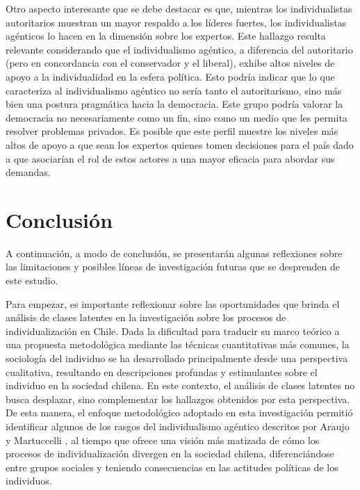\documentclass[12pt,twoside]{templates/facsothesis}
\begin{document}
Otro aspecto interesante que se debe destacar es que, mientras los individualistas autoritarios muestran un mayor respaldo a los líderes fuertes, los individualistas agénticos lo hacen en la dimensión sobre los expertos. Este hallazgo resulta relevante considerando que el individualismo agéntico, a diferencia del autoritario (pero en concordancia con el conservador y el liberal), exhibe altos niveles de apoyo a la individualidad en la esfera política. Esto podría indicar que lo que caracteriza al individualismo agéntico no sería tanto el autoritarismo, sino más bien una postura pragmática hacia la democracia. Este grupo podría valorar la democracia no necesariamente como un fin, sino como un medio que les permita resolver problemas privados. Es posible que este perfil muestre los niveles más altos de apoyo a que sean los expertos quienes tomen decisiones para el país dado a que asociarían el rol de estos actores a una mayor eficacia para abordar sus demandas.

\hypertarget{conclusiuxf3n}{%
\chapter{Conclusión}\label{conclusiuxf3n}}

A continuación, a modo de conclusión, se presentarán algunas reflexiones sobre las limitaciones y posibles líneas de investigación futuras que se desprenden de este estudio.

Para empezar, es importante reflexionar sobre las oportunidades que brinda el análisis de clases latentes en la investigación sobre los procesos de individualización en Chile. Dada la dificultad para traducir su marco teórico a una propuesta metodológica mediante las técnicas cuantitativas más comunes, la sociología del individuo se ha desarrollado principalmente desde una perspectiva cualitativa, resultando en descripciones profundas y estimulantes sobre el individuo en la sociedad chilena. En este contexto, el análisis de clases latentes no busca desplazar, sino complementar los hallazgos obtenidos por esta perspectiva. De esta manera, el enfoque metodológico adoptado en esta investigación permitió identificar algunos de los rasgos del individualismo agéntico descritos por Araujo y Martuccelli \citeyearpar{araujo2014}, al tiempo que ofrece una visión más matizada de cómo los procesos de individualización divergen en la sociedad chilena, diferenciándose entre grupos sociales y teniendo consecuencias en las actitudes políticas de los individuos.
\end{document}
